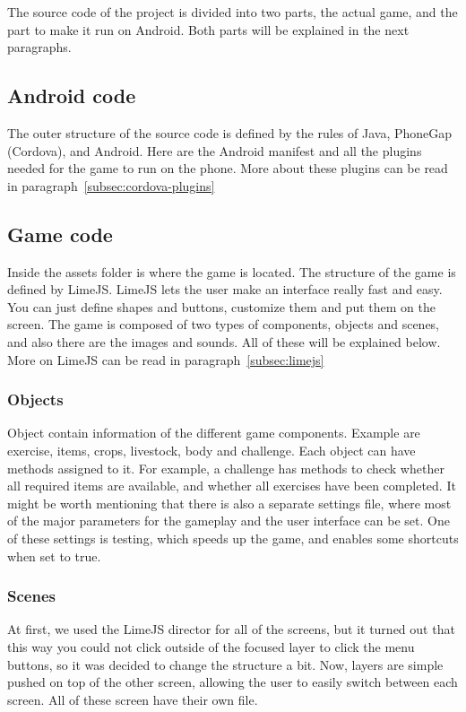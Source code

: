 The source code of the project is divided into two parts, the actual game, and the part to make it run on Android. Both parts will be explained in the next paragraphs.

\subsection{Android code}
The outer structure of the source code is defined by the rules of Java, PhoneGap (Cordova), and Android. Here are the Android manifest and all the plugins needed for the game to run on the phone. More about these plugins can be read in paragraph~\ref{subsec:cordova-plugins}

\subsection{Game code}
Inside the assets folder is where the game is located. The structure of the game is defined by LimeJS.
LimeJS lets the user make an interface really fast and easy. You can just define shapes and buttons, customize them and put them on the screen. The game is composed of two types of components, objects and scenes, and also there are the images and sounds. All of these will be explained below. More on LimeJS can be read in paragraph~\ref{subsec:limejs}

\subsubsection{Objects}
Object contain information of the different game components. Example are exercise, items, crops, livestock, body and challenge. Each object can have methods assigned to it. For example, a challenge has methods to check whether all required items are available, and whether all exercises have been completed. It might be worth mentioning that there is also a separate settings file, where most of the major parameters for the gameplay and the user interface can be set. One of these settings is testing, which speeds up the game, and enables some shortcuts when set to true.

\subsubsection{Scenes}
At first, we used the LimeJS director for all of the screens, but it turned out that this way you could not click outside of the focused layer to click the menu buttons, so it was decided to change the structure a bit. Now, layers are simple pushed on top of the other screen, allowing the user to easily switch between each screen. All of these screen have their own file.

